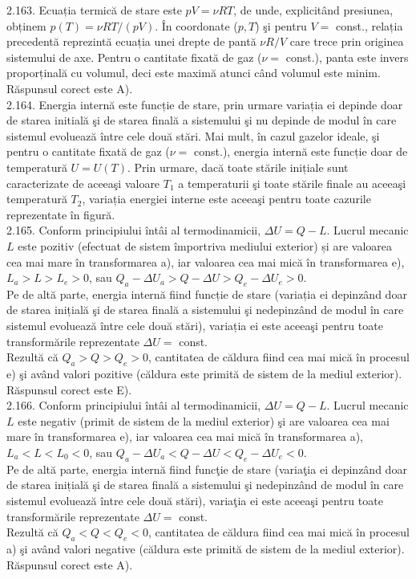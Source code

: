 2.163. Ecuația termică de stare este $p V=\nu R T$, de unde, explicitând presiunea, obținem $p(T)=\nu R T /(p V)$. În coordonate ($p, T$) şi pentru $V=$ const., relația precedentă reprezintă ecuația unei drepte de pantă $\nu R / V$ care trece prin originea sistemului de axe. Pentru o cantitate fixată de gaz ($\nu=$ const.), panta este invers proporținală cu volumul, deci este maximă atunci când volumul este minim. Răspunsul corect este A).\\

2.164. Energia internă este funcție de stare, prin urmare variația ei depinde doar de starea initială şi de starea finală a sistemului şi nu depinde de modul în care sistemul evoluează între cele două stări. Mai mult, în cazul gazelor ideale, şi pentru o cantitate fixată de gaz ($\nu=$ const.), energia internă este funcție doar de temperatură $U=U(T)$. Prin urmare, dacă toate stările inițiale sunt caracterizate de aceeaşi valoare $T_{1}$ a temperaturii şi toate stările finale au aceeaşi temperatură $T_{2}$, variația energiei interne este aceeaşi pentru toate cazurile reprezentate în figură.\\

2.165. Conform principiului întâi al termodinamicii, $\Delta U=Q-L$. Lucrul mecanic $L$ este pozitiv (efectuat de sistem împortriva mediului exterior) și are valoarea cea mai mare în transformarea a), iar valoarea cea mai mică în transformarea e), $L_{a}>L>L_{e}>0$, sau $Q_{a}-\Delta U_{a}>Q-\Delta U>Q_{e}-\Delta U_{e}>0$.\\ Pe de altă parte, energia internă fiind funcție de stare (variația ei depinzând doar de starea inițială şi de starea finală a sistemului şi nedepinzând de modul în care sistemul evoluează între cele două stări), variația ei este aceeaşi pentru toate transformările reprezentate $\Delta U=$ const.\\ Rezultă că $Q_{a}>Q>Q_{e}>0$, cantitatea de căldura fiind cea mai mică în procesul e) şi având valori pozitive (căldura este primită de sistem de la mediul exterior). Răspunsul corect este E).\\

2.166. Conform principiului întâi al termodinamicii, $\Delta U=Q-L$. Lucrul mecanic $L$ este negativ (primit de sistem de la mediul exterior) şi are valoarea cea mai mare în transformarea e), iar valoarea cea mai mică în transformarea a), $L_{a}<L<L_{0}<0$, sau $Q_{a}-\Delta U_{a}<Q-\Delta U<Q_{e}-\Delta U_{e}<0$.\\ Pe de altă parte, energia internă fiind funcţie de stare (variaţia ei depinzând doar de starea inițială şi de starea finală a sistemului şi nedepinzând de modul în care sistemul evoluează între cele două stări), variaţia ei este aceeaşi pentru toate transformările reprezentate $\Delta U=$ const.\\ Rezultă că $Q_{a}<Q<Q_{e}<0$, cantitatea de căldura fiind cea mai mică în procesul a) şi având valori negative (căldura este primită de sistem de la mediul exterior). Răspunsul corect este A).\\

